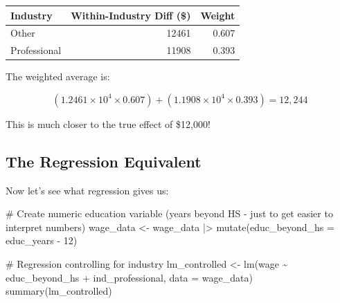 \documentclass[
  letterpaper,
  DIV=11,
  numbers=noendperiod]{scrreprt}
\newenvironment{Shaded}{\begin{snugshade}}{\end{snugshade}}
\newcommand{\AttributeTok}[1]{\textcolor[rgb]{0.40,0.45,0.13}{#1}}
\newcommand{\CommentTok}[1]{\textcolor[rgb]{0.37,0.37,0.37}{#1}}
\newcommand{\DecValTok}[1]{\textcolor[rgb]{0.68,0.00,0.00}{#1}}
\newcommand{\FunctionTok}[1]{\textcolor[rgb]{0.28,0.35,0.67}{#1}}
\newcommand{\NormalTok}[1]{\textcolor[rgb]{0.00,0.23,0.31}{#1}}
\newcommand{\OtherTok}[1]{\textcolor[rgb]{0.00,0.23,0.31}{#1}}
\newcommand{\SpecialCharTok}[1]{\textcolor[rgb]{0.37,0.37,0.37}{#1}}
\newcounter{none} %
\begin{document}
{\def\LTcaptype{none} %
\begin{longtable}[]{@{}lrr@{}}
\toprule\noalign{}
Industry & Within-Industry Diff (\$) & Weight \\
\midrule\noalign{}
\endhead
\bottomrule\noalign{}
\endlastfoot
Other & 12461 & 0.607 \\
Professional & 11908 & 0.393 \\
\end{longtable}
}

\begin{Shaded}
\end{Shaded}

The weighted average is:

\[
(\ensuremath{1.2461\times 10^{4}} \times 0.607) + (\ensuremath{1.1908\times 10^{4}} \times 0.393) = 12,244
\]

This is much closer to the true effect of \$12,000!

\subsection{The Regression Equivalent}\label{the-regression-equivalent}

Now let's see what regression gives us:

\begin{Shaded}
\begin{Highlighting}[]
\CommentTok{\# Create numeric education variable (years beyond HS {-} just to get easier to interpret numbers)}
\NormalTok{wage\_data }\OtherTok{\textless{}{-}}\NormalTok{ wage\_data }\SpecialCharTok{|\textgreater{}}
  \FunctionTok{mutate}\NormalTok{(}\AttributeTok{educ\_beyond\_hs =}\NormalTok{ educ\_years }\SpecialCharTok{{-}} \DecValTok{12}\NormalTok{)}

\CommentTok{\# Regression controlling for industry}
\NormalTok{lm\_controlled }\OtherTok{\textless{}{-}} \FunctionTok{lm}\NormalTok{(wage }\SpecialCharTok{\textasciitilde{}}\NormalTok{ educ\_beyond\_hs }\SpecialCharTok{+}\NormalTok{ ind\_professional, }\AttributeTok{data =}\NormalTok{ wage\_data)}
\FunctionTok{summary}\NormalTok{(lm\_controlled)}
\end{Highlighting}
\end{Shaded}
\end{document}
